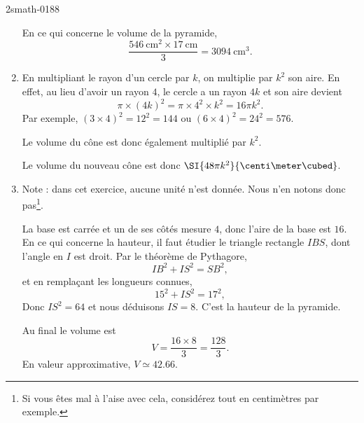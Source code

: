 \begin{corrige}{2smath-0188}
\begin{enumerate}
        En ce qui concerne le volume de la pyramide,
        \begin{equation}
            \frac{ \SI{546}{\centi\meter\squared}\times \SI{17}{\centi\meter} }{ 3 }=\SI{3094}{\centi\meter\cubed}.
        \end{equation}
    \item
    En multipliant le rayon d'un cercle par \( k\), on multiplie par \( k^2\) son aire. En effet, au lieu d'avoir un rayon \( 4\), le cercle a un rayon \( 4k\) et son aire devient
    \begin{equation}
        \pi\times (4k)^2=\pi\times 4^2\times k^2=16\pi k^2.
    \end{equation}
    Par exemple, \( (3\times 4)^2=12^2=144\) ou \( (6\times 4)^2=24^2=576\).

    Le volume du cône est donc également multiplié par \( k^2\).

    Le volume du nouveau cône est donc \( \SI{48\pi k^2}{\centi\meter\cubed}\).
\item

    Note : dans cet exercice, aucune unité n'est donnée. Nous n'en notons donc pas\footnote{Si vous êtes mal à l'aise avec cela, considérez tout en centimètres par exemple.}.

    La base est carrée et un de ses côtés mesure \( 4\), donc l'aire de la base est \( 16\). En ce qui concerne la hauteur, il faut étudier le triangle rectangle \( IBS\), dont l'angle en \( I\) est droit. Par le théorème de Pythagore,
    \begin{equation}
        IB^2+IS^2=SB^2,
    \end{equation}
    et en remplaçant les longueurs connues,
    \begin{equation}
        15^2+IS^2=17^2,
    \end{equation}
    Donc \( IS^2=64\) et nous déduisons \( IS=8\). C'est la hauteur de la pyramide.

    Au final le volume est
    \begin{equation}
        V=\frac{ 16\times 8 }{ 3 }=\frac{ 128 }{ 3 }.
    \end{equation}
    En valeur approximative, \( V\simeq 42.66\).

\end{enumerate}

\end{corrige}
